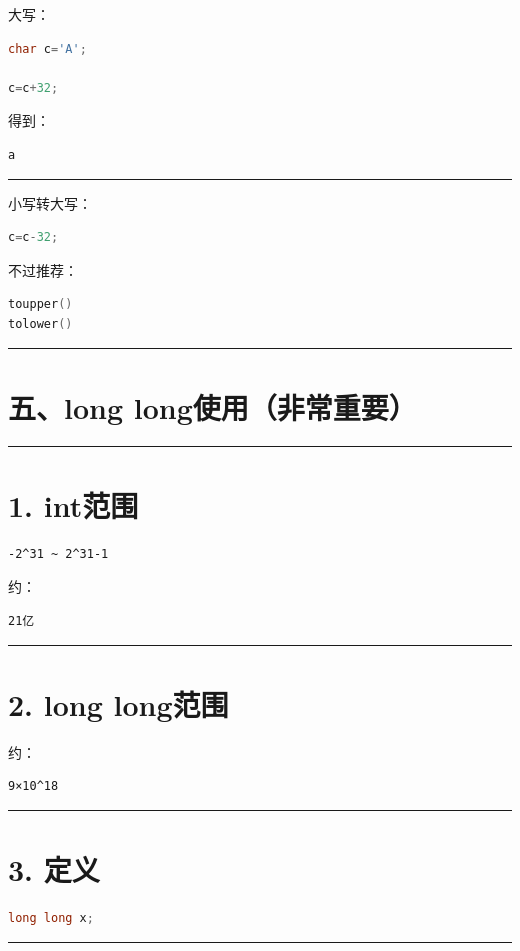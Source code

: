 \documentclass[10pt,twocolumn]{extarticle}
\begin{document}
大写：
\begin{lstlisting}[language=C++]
char c='A';

c=c+32;
\end{lstlisting}
得到：
\begin{lstlisting}
a
\end{lstlisting}

\noindent\rule{\linewidth}{0.4pt}

小写转大写：
\begin{lstlisting}[language=C++]
c=c-32;
\end{lstlisting}
不过推荐：
\begin{lstlisting}[language=C++]
toupper()
tolower()
\end{lstlisting}

\noindent\rule{\linewidth}{0.4pt}

\section{五、long long使用（非常重要）}

\noindent\rule{\linewidth}{0.4pt}

\section{1. int范围}
\begin{lstlisting}
-2^31 ~ 2^31-1
\end{lstlisting}
约：
\begin{lstlisting}
21亿
\end{lstlisting}

\noindent\rule{\linewidth}{0.4pt}

\section{2. long long范围}
约：
\begin{lstlisting}
9×10^18
\end{lstlisting}

\noindent\rule{\linewidth}{0.4pt}

\section{3. 定义}
\begin{lstlisting}[language=C++]
long long x;
\end{lstlisting}

\noindent\rule{\linewidth}{0.4pt}
\end{document}
